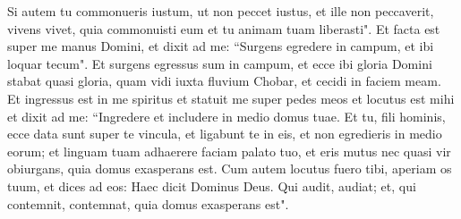 \begin{biblechapter}
\verse Si autem tu commonueris iustum, ut non peccet iustus, et ille non peccaverit, vivens vivet, quia commonuisti eum et tu animam tuam liberasti". 
\verse Et facta est super me manus Domini, et dixit ad me: “Surgens egredere in campum, et ibi loquar tecum". 
\verse Et surgens egressus sum in campum, et ecce ibi gloria Domini stabat quasi gloria, quam vidi iuxta fluvium Chobar, et cecidi in faciem meam. 
\verse Et ingressus est in me spiritus et statuit me super pedes meos et locutus est mihi et dixit ad me: “Ingredere et includere in medio domus tuae. 
\verse Et tu, fili hominis, ecce data sunt super te vincula, et ligabunt te in eis, et non egredieris in medio eorum; 
\verse et linguam tuam adhaerere faciam palato tuo, et eris mutus nec quasi vir obiurgans, quia domus exasperans est. 
\verse Cum autem locutus fuero tibi, aperiam os tuum, et dices ad eos: Haec dicit Dominus Deus. Qui audit, audiat; et, qui contemnit, contemnat, quia domus exasperans est". 
\end{biblechapter}

